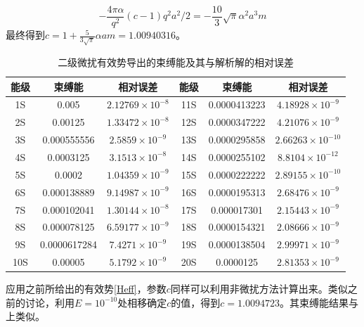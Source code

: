 \documentclass[hyperref,cs4size,titlepage,twoside]{ctexart}
\begin{document}
\begin{equation}
  -\frac{4\pi\alpha}{q^2}(c-1)q^2a^2/2=-\frac{10}{3} \sqrt{\pi } \alpha^2  a^3 m
\end{equation}
最终得到$\displaystyle c=1+\frac{5}{3\sqrt{\pi}}\alpha a m=1.00940316$。
\begin{table}[!htbp]
  \centering
  \begin{tabular}{|cccccc|}
    \hline
    能级&束缚能&相对误差&能级&束缚能&相对误差\\\hline
    1S & 0.005 & $2.12769\times10^{-8}$ & 11S & 0.0000413223 & $4.18928\times10^{-9}$\\
    2S & 0.00125 & $1.33472\times10^{-8}$ & 12S & 0.0000347222 & $4.21076\times10^{-9}$\\
    3S & 0.000555556 & $2.5859\times10^{-9}$ & 13S & 0.0000295858 & $2.66263\times10^{-10}$\\
    4S & 0.0003125 & $3.1513\times10^{-8}$ & 14S & 0.0000255102 & $8.8104\times10^{-12}$\\
    5S & 0.0002 & $1.04359\times10^{-9}$ & 15S & 0.0000222222 & $2.89155\times10^{-10}$\\
    6S & 0.000138889 & $9.14987\times10^{-9}$ & 16S & 0.0000195313 & $2.68476\times10^{-9}$\\
    7S & 0.000102041 & $1.30144\times10^{-8}$ & 17S & 0.000017301 & $2.15443\times10^{-9}$\\
    8S & 0.000078125 & $6.59177\times10^{-9}$ & 18S & 0.0000154321 & $2.08666\times10^{-9}$\\
    9S & 0.0000617284 & $7.4271\times10^{-9}$ & 19S & 0.0000138504 & $2.99971\times10^{-9}$\\
    10S & 0.00005 & $5.1792\times10^{-9}$ & 20S & 0.0000125 & $2.81353\times10^{-9}$\\
    \hline
  \end{tabular}
  \caption{二级微扰有效势导出的束缚能及其与解析解的相对误差}
\end{table}

应用之前所给出的有效势\eqref{Heff}，参数$c$同样可以利用非微扰方法计算出来。类似之前的讨论，利用$E=10^{-10}$处相移确定$c$的值，得到$c=1.0094723$。其束缚能结果与上类似。
\clearpage
\end{document}
